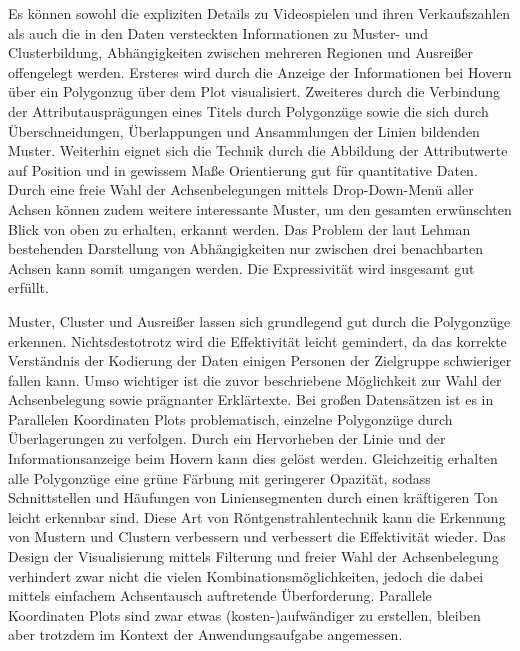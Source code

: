 \documentclass[usegeometry=true]{scrartcl}
\begin{document}
Es können sowohl die expliziten Details zu Videospielen und ihren Verkaufszahlen als auch die in den Daten versteckten Informationen zu Muster- und Clusterbildung, Abhängigkeiten zwischen mehreren Regionen und Ausreißer offengelegt werden.
Ersteres wird durch die Anzeige der Informationen bei Hovern über ein Polygonzug über dem Plot visualisiert. 
Zweiteres durch die Verbindung der Attributausprägungen eines Titels durch Polygonzüge sowie die sich durch Überschneidungen, Überlappungen und Ansammlungen der Linien bildenden Muster. 
Weiterhin eignet sich die Technik durch die Abbildung der Attributwerte auf Position und in gewissem Maße Orientierung gut für quantitative Daten.\cite{Bertin.1982}
Durch eine freie Wahl der Achsenbelegungen mittels Drop-Down-Menü aller Achsen können zudem weitere interessante Muster, um den gesamten erwünschten Blick von oben zu erhalten, erkannt werden. 
Das Problem der laut Lehman bestehenden Darstellung von Abhängigkeiten nur zwischen drei benachbarten Achsen kann somit umgangen werden.\cite[594]{Lehmann.2010}
Die Expressivität wird insgesamt gut erfüllt.

Muster, Cluster und Ausreißer lassen sich grundlegend gut durch die Polygonzüge erkennen. 
Nichtsdestotrotz wird die Effektivität leicht gemindert, da das korrekte Verständnis der Kodierung der Daten einigen Personen der Zielgruppe schwieriger fallen kann.
Umso wichtiger ist die zuvor beschriebene Möglichkeit zur Wahl der Achsenbelegung sowie prägnanter Erklärtexte.
Bei großen Datensätzen ist es in Parallelen Koordinaten Plots problematisch, einzelne Polygonzüge durch Überlagerungen zu verfolgen.
Durch ein Hervorheben der Linie und der Informationsanzeige beim Hovern kann dies gelöst werden. 
Gleichzeitig erhalten alle Polygonzüge eine grüne Färbung mit geringerer Opazität, sodass Schnittstellen und Häufungen von Liniensegmenten durch einen kräftigeren Ton leicht erkennbar sind. 
Diese Art von Röntgenstrahlentechnik kann die Erkennung von Mustern und Clustern verbessern und verbessert die Effektivität wieder.
Das Design der Visualisierung mittels Filterung und freier Wahl der Achsenbelegung verhindert zwar nicht die vielen Kombinationsmöglichkeiten, jedoch die dabei mittels einfachem Achsentausch auftretende Überforderung.
Parallele Koordinaten Plots sind zwar etwas (kosten-)aufwändiger zu erstellen, bleiben aber trotzdem im Kontext der Anwendungsaufgabe angemessen.
\end{document}

